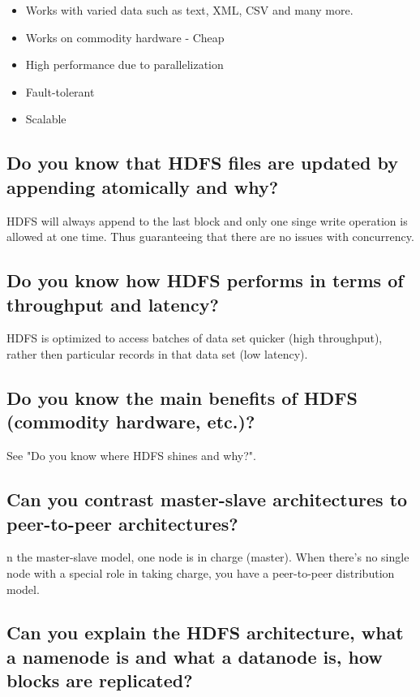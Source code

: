\documentclass{article}
\begin{document}
\begin{itemize}
    \item Works with varied data such as text, XML, CSV and many more.
    \item Works on commodity hardware - Cheap
    \item High performance due to parallelization
    \item Fault-tolerant
    \item Scalable
\end{itemize}

\subsection{Do you know that HDFS files are updated by appending atomically and why?}

HDFS will always append to the last block and only one singe write operation is allowed at one time. Thus guaranteeing that there are no issues with concurrency.

\subsection{Do you know how HDFS performs in terms of throughput and latency?}

{\color{red} HDFS is optimized to access batches of data set quicker (high throughput), rather then particular records in that data set (low latency).}

\subsection{Do you know the main benefits of HDFS (commodity hardware, etc.)?}

See "Do you know where HDFS shines and why?".

\subsection{Can you contrast master-slave architectures to peer-to-peer architectures?}

n the master-slave model, one node is in charge (master). When there’s no single node with a special role in taking charge, you have a peer-to-peer distribution model.

\subsection{Can you explain the HDFS architecture, what a namenode is and what a datanode is, how blocks are replicated?}
\end{document}
